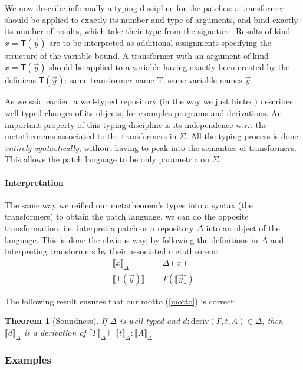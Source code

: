 \documentclass[twoside,a4paper,12pt]{article}
\newtheorem{theorem}{Theorem}
\begin{document}
We now describe informally a typing discipline for the patches: a
transformer should be applied to exactly its number and type of
arguments, and bind exactly its number of results, which take their
type from the signature. Results of kind $x=\mathsf{T}(\vec y)$ are to
be interpreted as additional assignments specifying the structure of
the variable bound. A transformer with an argument of kind
$x=\mathsf{T}(\vec y)$ should be applied to a variable having exactly
been created by the definiens $\mathsf{T}(\vec y)$: same transformer
name \textsf{T}, same variable names $\vec y$.

As we said earlier, a well-typed repository (in the way we just
hinted) describes well-typed changes of its objects, for examples
programs and derivations. An important property of this typing
discipline is its independence w.r.t the metatheorems associated to
the transformers in $\Sigma$. All the typing process is done
\emph{entirely syntactically}, without having to peak into the
semantics of transformers. This allows the patch language to be only
parametric on $\Sigma$.

\newcommand{\interp}[1]{\llbracket{#1}\rrbracket}

\paragraph{Interpretation}

The same way we reified our metatheorem's types into a syntax (the
transformers) to obtain the patch language, we can do the opposite
transformation, i.e. interpret a patch or a repository $\Delta$ into
an object of the language. This is done the obvious way, by following
the definitions in $\Delta$ and interpreting transformers by their
associated metatheorem:
\begin{align*}
  \interp x_\Delta &= \Delta(x) \\
  \interp{\mathsf{T}(\vec y)} &= T(\interp{\vec y})
\end{align*}

The following result ensures that our motto (\autoref{motto}) is correct:
\begin{theorem}[Soundness]
    If $\Delta$ is well-typed and $d : \mathrm{deriv}(\Gamma,t,A) \in
    \Delta$, then $\interp d_\Delta$ is a derivation of
    $\interp\Gamma_\Delta\vdash\interp t_\Delta : \interp{A}_\Delta $
\end{theorem}

\subsubsection{Examples}
\end{document}
